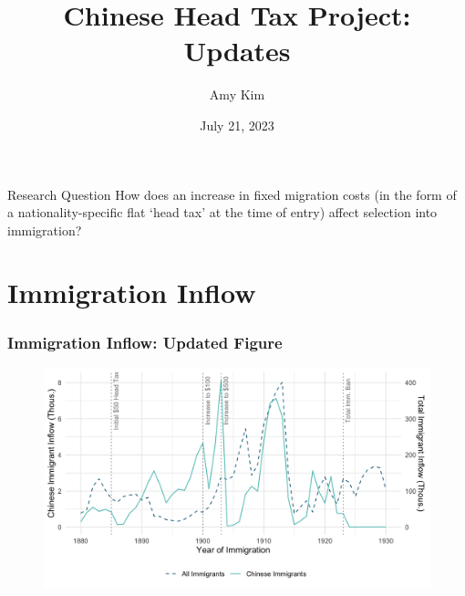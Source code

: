 \documentclass[pdf]{beamer}
\title{Chinese Head Tax Project: Updates}
\author{Amy Kim}
\date{July 21, 2023}
\begin{document}
\begin{frame}[plain]
    \titlepage
\end{frame}

\begin{frame}{Research Question}
    How does an increase in fixed migration costs (in the form of a nationality-specific flat `head tax' at the time of entry) affect selection into immigration?
\end{frame}



\section{Immigration Inflow}
\begin{frame}[label = fig2_flow]
    \frametitle{Immigration Inflow: Updated Figure}
    \centering 
    \begin{figure}
        \includegraphics[width = \textwidth]{../../figs/fig2_flow.png}
    \end{figure}
    \hyperlink{fig2_flow_old}{}
\end{frame}
\end{document}
